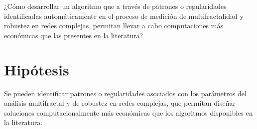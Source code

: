 ¿Cómo desarrollar un algoritmo que a través de patrones o regularidades identificadas automáticamente en el proceso de medición de multifractalidad y robustez en redes complejas, permitan llevar a cabo computaciones más económicas que las presentes en la literatura?

\section{Hipótesis}

Se pueden identificar patrones o regularidades asociados con los parámetros del análisis multifractal y de robustez en redes complejas, que permitan diseñar soluciones computacionalmente más económicas que los algoritmos disponibles en la literatura.